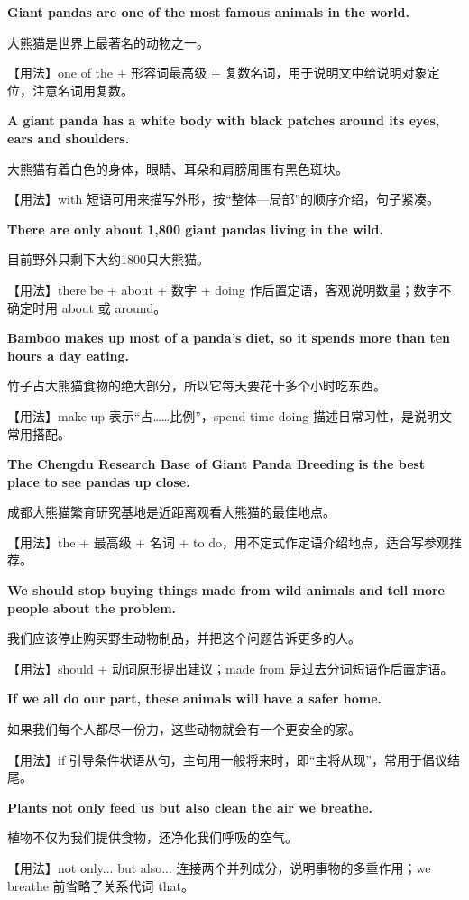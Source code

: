 \documentclass[UTF8,a4paper,11pt,oneside]{ctexbook}
\newcommand{\fansection}[1]{%
  \par\addvspace{2.4ex}%
  \Needspace{6\baselineskip}%
  \noindent{\sffamily\Large\bfseries\color{mainblue}#1}\par
  \nopagebreak
  \addvspace{0.2ex}%
  \noindent{\color{rulelight}\rule{\linewidth}{0.9pt}}\par
  \addvspace{0.9ex}%
  \nobreak
}
\newcommand{\fanpat}[3]{%
  \item{\bfseries #1}\par\nopagebreak
  {\small\color{textgray}#2}\par\nopagebreak
  {\footnotesize\color{accent!90!black}【用法】#3}\par
}
\begin{document}
\fansection{〇、本单元写作常用句型}
\begin{fanpatterns}
\fanpat{Giant pandas are one of the most famous animals in the world.}{大熊猫是世界上最著名的动物之一。}{one of the + 形容词最高级 + 复数名词，用于说明文中给说明对象定位，注意名词用复数。}

\fanpat{A giant panda has a white body with black patches around its eyes, ears and shoulders.}{大熊猫有着白色的身体，眼睛、耳朵和肩膀周围有黑色斑块。}{with 短语可用来描写外形，按“整体—局部”的顺序介绍，句子紧凑。}

\fanpat{There are only about 1,800 giant pandas living in the wild.}{目前野外只剩下大约1800只大熊猫。}{there be + about + 数字 + doing 作后置定语，客观说明数量；数字不确定时用 about 或 around。}

\fanpat{Bamboo makes up most of a panda's diet, so it spends more than ten hours a day eating.}{竹子占大熊猫食物的绝大部分，所以它每天要花十多个小时吃东西。}{make up 表示“占……比例”，spend time doing 描述日常习性，是说明文常用搭配。}

\fanpat{The Chengdu Research Base of Giant Panda Breeding is the best place to see pandas up close.}{成都大熊猫繁育研究基地是近距离观看大熊猫的最佳地点。}{the + 最高级 + 名词 + to do，用不定式作定语介绍地点，适合写参观推荐。}

\fanpat{We should stop buying things made from wild animals and tell more people about the problem.}{我们应该停止购买野生动物制品，并把这个问题告诉更多的人。}{should + 动词原形提出建议；made from 是过去分词短语作后置定语。}

\fanpat{If we all do our part, these animals will have a safer home.}{如果我们每个人都尽一份力，这些动物就会有一个更安全的家。}{if 引导条件状语从句，主句用一般将来时，即“主将从现”，常用于倡议结尾。}

\fanpat{Plants not only feed us but also clean the air we breathe.}{植物不仅为我们提供食物，还净化我们呼吸的空气。}{not only... but also... 连接两个并列成分，说明事物的多重作用；we breathe 前省略了关系代词 that。}

\end{fanpatterns}

\fansection{一、满分范文}
\end{document}
